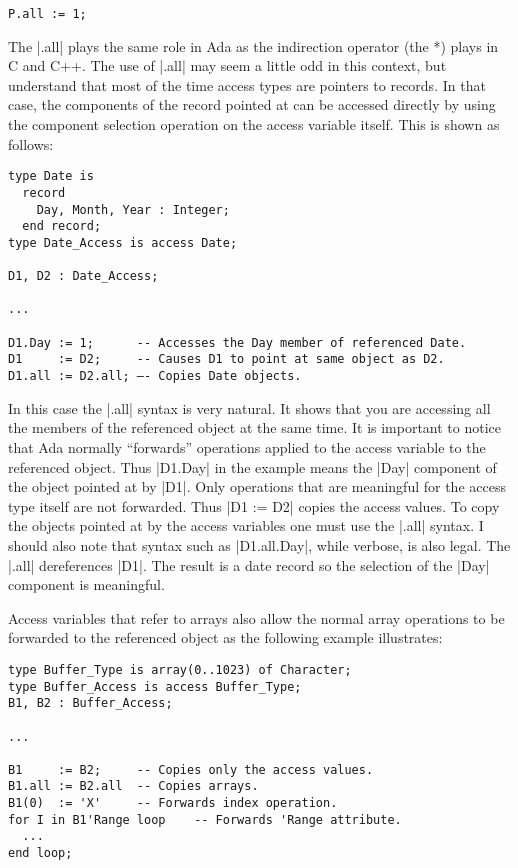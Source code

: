 \begin{lstlisting}
P.all := 1;
\end{lstlisting}

The |.all| plays the same role in Ada as the indirection operator (the *) plays in C and C++.
The use of |.all| may seem a little odd in this context, but understand that most of the time
access types are pointers to records. In that case, the components of the record pointed at can
be accessed directly by using the component selection operation on the access variable itself.
This is shown as follows:

\begin{lstlisting}
type Date is
  record
    Day, Month, Year : Integer;
  end record;
type Date_Access is access Date;

D1, D2 : Date_Access;

...

D1.Day := 1;      -- Accesses the Day member of referenced Date.
D1     := D2;     -- Causes D1 to point at same object as D2.
D1.all := D2.all; –- Copies Date objects.
\end{lstlisting}

In this case the |.all| syntax is very natural. It shows that you are accessing all the members
of the referenced object at the same time. It is important to notice that Ada normally
``forwards'' operations applied to the access variable to the referenced object. Thus |D1.Day|
in the example means the |Day| component of the object pointed at by |D1|. Only operations that
are meaningful for the access type itself are not forwarded. Thus |D1 := D2| copies the access
values. To copy the objects pointed at by the access variables one must use the |.all| syntax. I
should also note that syntax such as |D1.all.Day|, while verbose, is also legal. The |.all|
dereferences |D1|. The result is a date record so the selection of the |Day| component is
meaningful.

Access variables that refer to arrays also allow the normal array operations to be forwarded to
the referenced object as the following example illustrates:

\begin{lstlisting}
type Buffer_Type is array(0..1023) of Character;
type Buffer_Access is access Buffer_Type;
B1, B2 : Buffer_Access;

...

B1     := B2;     -- Copies only the access values.
B1.all := B2.all  -- Copies arrays.
B1(0)  := 'X'     -- Forwards index operation.
for I in B1'Range loop    -- Forwards 'Range attribute.
  ...
end loop;
\end{lstlisting}

